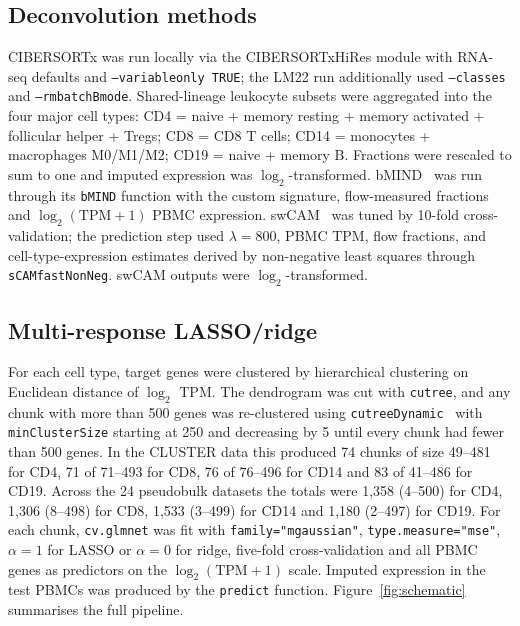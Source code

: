 \documentclass[11pt]{article}
\begin{document}
\subsection{Deconvolution methods}

CIBERSORTx was run locally via the CIBERSORTxHiRes module with
RNA-seq defaults and \texttt{--variableonly TRUE}; the LM22 run
additionally used \texttt{--classes} and \texttt{--rmbatchBmode}.
Shared-lineage leukocyte subsets were aggregated into the four major
cell types: CD4 = naive + memory resting + memory activated +
follicular helper + Tregs; CD8 = CD8 T cells; CD14 = monocytes +
macrophages M0/M1/M2; CD19 = naive + memory B. Fractions were rescaled
to sum to one and imputed expression was $\log_{2}$-transformed.
bMIND~\citep{wang2024bmind} was run through its \texttt{bMIND} function
with the custom signature, flow-measured fractions and
$\log_{2}(\mathrm{TPM}+1)$ PBMC expression. swCAM~\citep{chen2022swcam}
was tuned by 10-fold cross-validation; the prediction step used
$\lambda = 800$, PBMC TPM, flow fractions, and cell-type-expression
estimates derived by non-negative least squares through
\texttt{sCAMfastNonNeg}. swCAM outputs were $\log_{2}$-transformed.

\subsection{Multi-response LASSO/ridge}

For each cell type, target genes were clustered by hierarchical
clustering on Euclidean distance of $\log_{2}$ TPM. The dendrogram was
cut with \texttt{cutree}, and any chunk with more than 500 genes was
re-clustered using \texttt{cutreeDynamic}~\citep{langfelder2008dynamictreecut}
with \texttt{minClusterSize} starting at 250 and decreasing by 5 until
every chunk had fewer than 500 genes. In the CLUSTER data this
produced 74 chunks of size 49--481 for CD4, 71 of 71--493 for CD8, 76
of 76--496 for CD14 and 83 of 41--486 for CD19. Across the 24
pseudobulk datasets the totals were 1{,}358 (4--500) for CD4, 1{,}306
(8--498) for CD8, 1{,}533 (3--499) for CD14 and 1{,}180 (2--497) for
CD19. For each chunk, \texttt{cv.glmnet} was fit with
\texttt{family="mgaussian"}, \texttt{type.measure="mse"}, $\alpha = 1$
for LASSO or $\alpha = 0$ for ridge, five-fold cross-validation and
all PBMC genes as predictors on the $\log_{2}(\mathrm{TPM}+1)$ scale.
Imputed expression in the test PBMCs was produced by the \texttt{predict}
function. Figure~\ref{fig:schematic} summarises the full pipeline.
\end{document}
